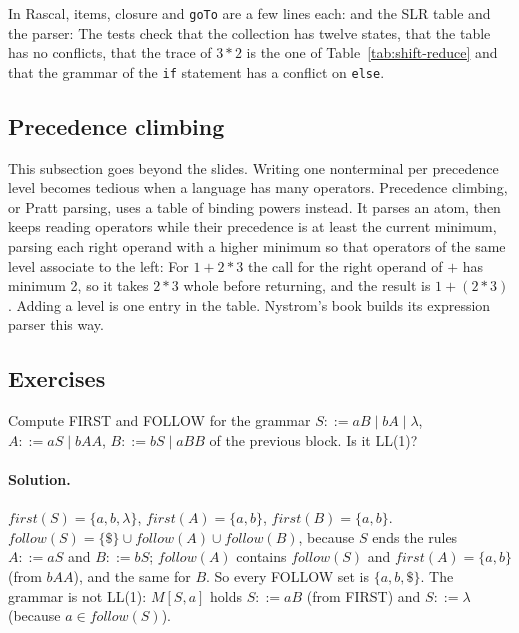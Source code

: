 In Rascal, items, closure and \texttt{goTo} are a few lines each:
and the SLR table and the parser:
The tests check that the collection has twelve states, that the table has no
conflicts, that the trace of $3*2$ is the one of Table~\ref{tab:shift-reduce}
and that the grammar of the \texttt{if} statement has a conflict on
\texttt{else}.

\subsection{Precedence climbing}

This subsection goes beyond the slides. Writing one nonterminal per
precedence level becomes tedious when a language has many operators.
Precedence climbing, or Pratt parsing, uses a table of binding powers
instead. It parses an atom, then keeps reading operators while their
precedence is at least the current minimum, parsing each right operand with
a higher minimum so that operators of the same level associate to the left:
For $1+2*3$ the call for the right operand of $+$ has minimum 2, so it takes
$2*3$ whole before returning, and the result is $1 + (2*3)$. Adding a level is
one entry in the table. Nystrom's book builds its expression parser this way.

\subsection{Exercises}

\begin{exercise}
Compute FIRST and FOLLOW for the grammar
$S ::= aB \mid bA \mid \lambda$, $A ::= aS \mid bAA$, $B ::= bS \mid aBB$ of the
previous block. Is it LL(1)?
\end{exercise}

\paragraph{Solution.} $\mathit{first}(S) = \{a, b, \lambda\}$, $\mathit{first}(A) =
\{a, b\}$, $\mathit{first}(B) = \{a, b\}$. $\mathit{follow}(S) = \{\$\} \cup
\mathit{follow}(A) \cup \mathit{follow}(B)$, because $S$ ends the rules $A ::= aS$
and $B ::= bS$; $\mathit{follow}(A)$ contains $\mathit{follow}(S)$ and
$\mathit{first}(A) = \{a, b\}$ (from $bAA$), and the same for $B$. So every
FOLLOW set is $\{a, b, \$\}$. The grammar is not LL(1): $M[S, a]$ holds
$S ::= aB$ (from FIRST) and $S ::= \lambda$ (because $a \in \mathit{follow}(S)$).

